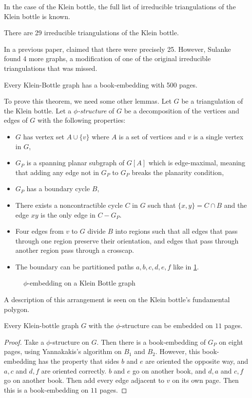 In the case of the Klein bottle, the full list of irreducible triangulations of the Klein bottle is known. 
\begin{theorem}
    There are 29 irreducible triangulations of the Klein bottle. 
\end{theorem} 
In a previous paper, \textcite{lawrencenkoIrreducibleTriangulationsKlein1997} claimed that there were precisely 25. However, Sulanke found 4 more graphs, a modification of one of the original irreducible triangulations that was missed. 

\begin{theorem}
    Every Klein-Bottle graph has a book-embedding with 500 pages.
\end{theorem}

To prove this theorem, we need some other lemmas. Let $G$ be a triangulation of the Klein bottle. Let a \textit{$\phi$-structure} of $G$ be a decomposition of the vertices and edges of $G$ with the following properties:
\begin{itemize}
    \item $G$ has vertex set $A \cup \{v\}$ where $A$ is a set of vertices and $v$ is a single vertex in $G$,
    \item $G_P$ is a spanning planar subgraph of $G[A]$ which is edge-maximal, meaning that adding any edge not in $G_P$ to $G_P$ breaks the planarity condition,
    \item $G_P$ has a boundary cycle $B$,
    \item There exists a noncontractible cycle $C$ in $G$ such that $\{x, y\} = C \cap B$ and the edge $xy$ is the only edge in $C - G_P$. 
    \item Four edges from $v$ to $G$ divide $B$ into regions such that all edges that pass through one region preserve their orientation, and edges that pass through another region pass through a crosscap. 
    \item The boundary can be partitioned paths $a, b, c, d, e, f$ like in \cref{fig:phiembedding}. 
\end{itemize}

\begin{figure}[h]
    \centering
    
    \caption{$\phi$-embedding on a Klein Bottle graph}\label{fig:phiembedding}
\end{figure}

A description of this arrangement is seen on the Klein bottle's fundamental polygon. 
\begin{claim}
    Every Klein-bottle graph $G$ with the $\phi$-structure can be embedded on $11$ pages. 
\end{claim}
\begin{proof}
    Take a $\phi$-structure on $G$. Then there is a book-embedding of $G_P$ on eight pages, using Yannakakis's algorithm on $B_1$ and $B_2$. However, this book-embedding has the property that sides $b$ and $e$ are oriented the opposite way, and $a, c$ and $d, f$ are oriented correctly. $b$ and $e$ go on another book, and $d, a$ and $c, f$ go on another book. Then add every edge adjacent to $v$ on its own page. Then this is a book-embedding on $11$ pages. 
\end{proof}

